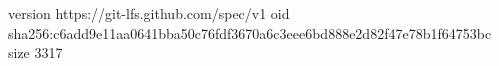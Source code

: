 version https://git-lfs.github.com/spec/v1
oid sha256:c6add9e11aa0641bba50c76fdf3670a6c3eee6bd888e2d82f47e78b1f64753bc
size 3317
